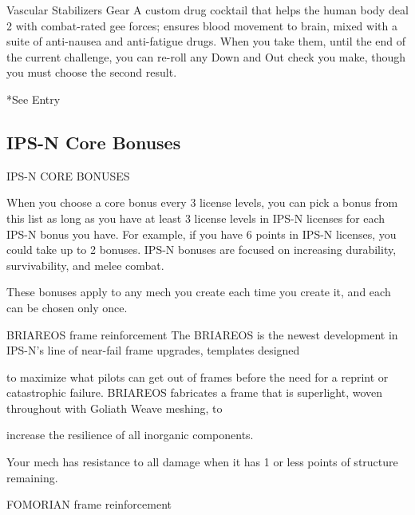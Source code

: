   Vascular Stabilizers          Gear        A custom drug cocktail that helps the human body deal                   2 
                                            with combat-rated gee forces; ensures blood movement to  
                                             brain, mixed with a suite of anti-nausea and anti-fatigue  
                                             drugs. When you take them, until the end of the current  
                                             challenge, you can re-roll any Down and Out check you  
                                             make, though you must choose the second result. 

                                                                                                                          


*See Entry
 

                                                                                                                          \subsection{IPS-N Core Bonuses}


                                        IPS-N CORE BONUSES  

When you choose a core bonus every 3 license levels, you can pick a bonus from this list as long  
as you have at least 3 license levels in IPS-N licenses for each IPS-N bonus you have. For  
example, if you have 6 points in IPS-N licenses, you could take up to 2 bonuses. IPS-N bonuses  
are focused on increasing durability, survivability, and melee combat.
 

These bonuses apply to any mech you create each time you create it, and each can be chosen  
only once.
 

BRIAREOS frame reinforcement  
The BRIAREOS is the newest development in IPS-N’s line of near-fail frame upgrades, templates designed  

to maximize what pilots can get out of frames before the need for a reprint or catastrophic failure.  
BRIAREOS fabricates a frame that is superlight, woven throughout with Goliath Weave meshing, to  

increase the resilience of all inorganic components.   

Your mech has resistance to all damage when it has 1 or less points of structure remaining.
 

FOMORIAN frame reinforcement  

